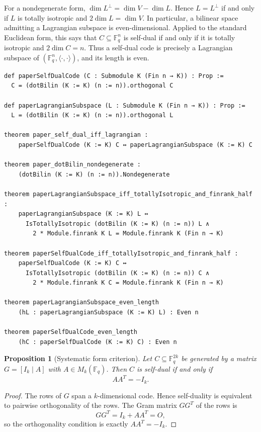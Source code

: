 \documentclass[12pt]{article}
\newtheorem{prop}[theorem]{Proposition}
\newcommand{\F}{\mathbb{F}}
\begin{document}
\noindent
For a nondegenerate form,
\(\dim L^\perp=\dim V-\dim L\). Hence \(L=L^\perp\) if and only if
\(L\) is totally isotropic and \(2\dim L=\dim V\). In particular, a
bilinear space admitting a Lagrangian subspace is even-dimensional.
Applied to the standard Euclidean form, this says that
\(C\subseteq\F_q^n\) is self-dual if and only if it is totally isotropic
and \(2\dim C=n\). Thus a self-dual code is precisely a Lagrangian
subspace of \((\F_q^n,\langle\cdot,\cdot\rangle)\), and its length is even.

\begin{lstlisting}[caption={Lean for Definitions~\ref{def:sd} and~\ref{def:lagrangian}.}]
def paperSelfDualCode (C : Submodule K (Fin n → K)) : Prop :=
  C = (dotBilin (K := K) (n := n)).orthogonal C

def paperLagrangianSubspace (L : Submodule K (Fin n → K)) : Prop :=
  L = (dotBilin (K := K) (n := n)).orthogonal L

theorem paper_self_dual_iff_lagrangian :
    paperSelfDualCode (K := K) C ↔ paperLagrangianSubspace (K := K) C

theorem paper_dotBilin_nondegenerate :
    (dotBilin (K := K) (n := n)).Nondegenerate

theorem paperLagrangianSubspace_iff_totallyIsotropic_and_finrank_half :
    paperLagrangianSubspace (K := K) L ↔
      IsTotallyIsotropic (dotBilin (K := K) (n := n)) L ∧
        2 * Module.finrank K L = Module.finrank K (Fin n → K)

theorem paperSelfDualCode_iff_totallyIsotropic_and_finrank_half :
    paperSelfDualCode (K := K) C ↔
      IsTotallyIsotropic (dotBilin (K := K) (n := n)) C ∧
        2 * Module.finrank K C = Module.finrank K (Fin n → K)

theorem paperLagrangianSubspace_even_length
    (hL : paperLagrangianSubspace (K := K) L) : Even n

theorem paperSelfDualCode_even_length
    (hC : paperSelfDualCode (K := K) C) : Even n
\end{lstlisting}

\begin{prop}[Systematic form criterion]\label{prop:systematic-form}
Let $C \subseteq \F_q^{2k}$ be generated by a matrix $G = [I_k \mid A]$ with $A \in M_k(\F_q)$. Then $C$ is self-dual if and only if
\[
AA^T = -I_k.
\]
\end{prop}

\begin{proof}
The rows of $G$ span a $k$-dimensional code. Hence self-duality is equivalent to pairwise orthogonality of the rows. The Gram matrix $GG^T$ of the rows is
\[
GG^T = I_k + AA^T = O,
\]
so the orthogonality condition is exactly $AA^T = -I_k$.
\end{proof}
\end{document}
